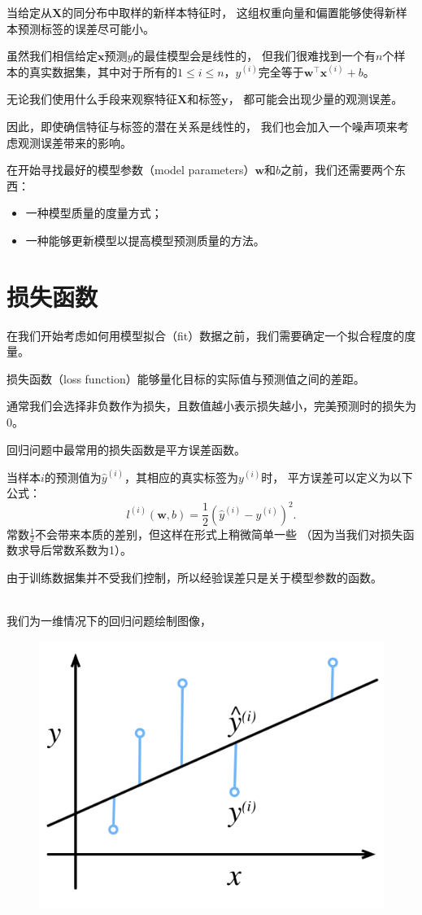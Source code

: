 \documentclass[openany,11pt]{book}
\begin{document}
当给定从$\mathbf{X}$的同分布中取样的新样本特征时，
这组权重向量和偏置能够使得新样本预测标签的误差尽可能小。

虽然我们相信给定$\mathbf{x}$预测$y$的最佳模型会是线性的，
但我们很难找到一个有$n$个样本的真实数据集，其中对于所有的$1 \leq i \leq n$，$y^{(i)}$完全等于$\mathbf{w}^\top \mathbf{x}^{(i)}+b$。

无论我们使用什么手段来观察特征$\mathbf{X}$和标签$\mathbf{y}$，
都可能会出现少量的观测误差。

因此，即使确信特征与标签的潜在关系是线性的，
我们也会加入一个噪声项来考虑观测误差带来的影响。

在开始寻找最好的模型参数（model parameters）$\mathbf{w}$和$b$之前，我们还需要两个东西：
\begin{itemize}
	\item 一种模型质量的度量方式；
	
	\item 一种能够更新模型以提高模型预测质量的方法。
\end{itemize}

\section{损失函数}

在我们开始考虑如何用模型拟合（fit）数据之前，我们需要确定一个拟合程度的度量。

损失函数（loss function）能够量化目标的实际值与预测值之间的差距。

通常我们会选择非负数作为损失，且数值越小表示损失越小，完美预测时的损失为0。

回归问题中最常用的损失函数是平方误差函数。

当样本$i$的预测值为$\hat{y}^{(i)}$，其相应的真实标签为$y^{(i)}$时，
平方误差可以定义为以下公式：
$$l^{(i)}(\mathbf{w}, b) = \frac{1}{2} \left(\hat{y}^{(i)} - y^{(i)}\right)^2.$$
常数$\frac{1}{2}$不会带来本质的差别，但这样在形式上稍微简单一些
（因为当我们对损失函数求导后常数系数为1）。

由于训练数据集并不受我们控制，所以经验误差只是关于模型参数的函数。

~\\
{\color{red} 我们为一维情况下的回归问题绘制图像，}

\begin{figure}
	\centering
	\includegraphics[width=0.5\linewidth]{image.png}
	\label{fig:placeholder}
\end{figure}
\end{document}
